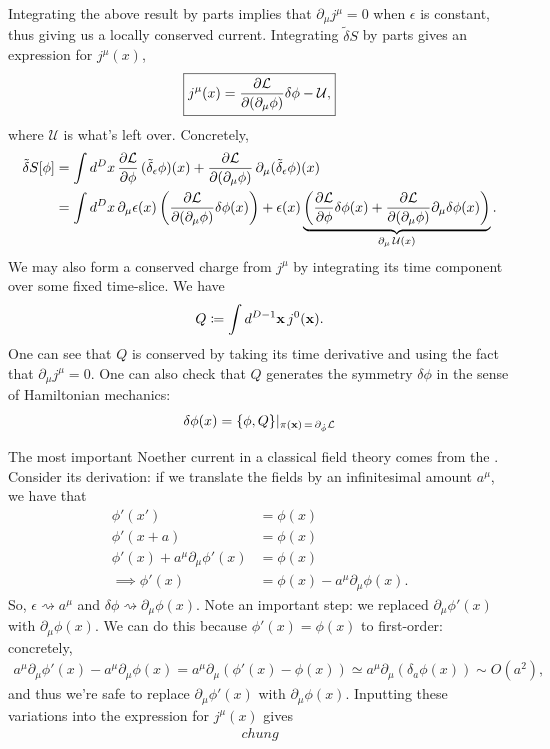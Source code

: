 \documentclass[11pt]{article}
\begin{document}
Integrating the above result by parts 
implies that $\partial_\mu j^\mu = 0$ when $\epsilon$ is constant, thus giving 
us a locally conserved current. Integrating $\tilde{\delta}S$ by parts gives an 
expression for $j^\mu(x)$,
\begin{align*}
    \boxed{j^\mu(x) = \frac{\partial \mathcal{L}}{\partial (\partial_\mu \phi)} \delta \phi - \mathcal{U},}
\end{align*}
where $\mathcal{U}$ is what's left over. Concretely,
\begin{align*}
    \tilde{\delta} S[\phi] 
    & = \int d^D x \, \frac{\partial \mathcal{L}}{\partial \phi} \, (\tilde{\delta}_\epsilon \phi)(x) + \frac{\partial \mathcal{L}}{\partial (\partial_\mu \phi)} \, \partial_\mu (\tilde{\delta}_\epsilon \phi)(x)\\
    & = \int d^D x \, \partial_\mu \epsilon(x) \left( \frac{\partial \mathcal{L}}{\partial (\partial_\mu \phi)} \delta \phi(x) \right) + \epsilon(x) \underbrace{\left(\frac{\partial \mathcal{L}}{\partial \phi} \delta \phi(x) + \frac{\partial \mathcal{L}}{\partial (\partial_\mu \phi)} \partial_\mu \delta \phi(x) \right)}_{\partial_\mu \, \mathcal{U}(x)}.
\end{align*}
We may also form a conserved charge from $j^\mu$ by integrating its
time component over some fixed time-slice. We have
\begin{align*}
    Q \coloneqq \int d^{D - 1} \mathbf{x} \, j^0(\mathbf{x}).
\end{align*}
One can see that $Q$ is conserved by taking its time derivative
and using the fact that $\partial_\mu j^\mu = 0$. One can also
check that $Q$ generates the symmetry $\delta \phi$ in the sense 
of Hamiltonian mechanics:
\begin{align*}
    \delta \phi(x) = \{ \phi, Q \}|_{\pi(\mathbf{x}) \, = \, \partial_{\dot{\phi}} \mathcal{L}}
\end{align*}

The most important Noether current in a classical field theory comes
from the . Consider its derivation: if we translate 
the fields by an infinitesimal amount $a^\mu$, we have that
\begin{align*}
    \phi'(x') & = \phi(x)\\
    \phi'(x + a) & = \phi(x)\\
    \phi'(x) + a^\mu \partial_\mu \phi'(x) & = \phi(x)\\
    \implies \phi'(x) & = \phi(x) - a^\mu \partial_\mu \phi(x).
\end{align*}
So, $\epsilon \rightsquigarrow a^\mu$ and $\delta \phi \rightsquigarrow \partial_\mu \phi(x)$.
Note an important step: we replaced $\partial_\mu \phi'(x)$ with $\partial_\mu \phi(x)$.
We can do this because $\phi'(x) = \phi(x)$ to first-order: concretely,
\begin{align*}
    a^\mu \partial_\mu \phi'(x) - a^\mu \partial_\mu \phi(x)
    = a^\mu \partial_\mu (\phi'(x) - \phi(x))
    \simeq a^\mu \partial_\mu (\delta_a \phi(x)) \sim O(a^2),
\end{align*}
and thus we're safe to replace $\partial_\mu \phi'(x)$ with $\partial_\mu \phi(x)$.
Inputting these variations into the expression for $j^\mu(x)$ gives
\begin{align*}
    chung
\end{align*}
\end{document}
